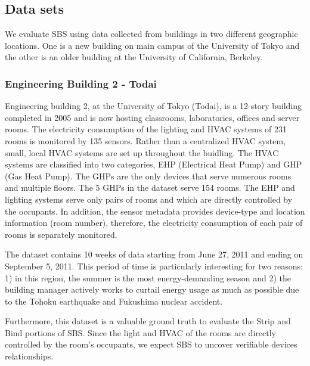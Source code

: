 \subsection{Data sets}
We evaluate SBS using data collected from buildings in two different geographic locations.  
One is a new building on main campus of the University of Tokyo and the other is an older building at 
the University of California, Berkeley.

\subsubsection{Engineering Building 2 - Todai}\label{data:engbldg2}
Engineering building 2, at the University of Tokyo (Todai), is a 12-story building completed in 2005 and is now 
hosting classrooms, laboratories, offices 
and server rooms.  
The electricity consumption of the lighting and HVAC systems of 231 rooms is monitored by 135 sensors.
Rather than a centralized HVAC system, small, local HVAC systems are set up throughout the buidling.  
The HVAC systems are classified into two categories, EHP (Electrical Heat Pump) and GHP (Gas Heat Pump).
The GHPs are the only devices that serve numerous rooms and multiple floors.  The 5 GHPs in the dataset serve 154 rooms.
The EHP and lighting systems serve only pairs of rooms and which are directly controlled by the occupants.
In addition, the sensor metadata provides device-type and location information (room number), 
therefore, the electricity consumption of each pair of rooms is separately monitored.

The dataset contains 10 weeks of data starting from June 27, 2011 and ending on September 5, 2011.
This period of time is particularly interesting for two reasons: 1) in this region, the summer is the most energy-demanding 
season and 2) the building manager actively works to curtail energy usage as much as possible due to the 
Tohoku earthquake and Fukushima nuclear accident.

Furthermore, this dataset is a valuable ground truth to evaluate the Strip and Bind portions of SBS.
Since the light and HVAC of the rooms are directly controlled by the room's occupants, we expect SBS to uncover verifiable devices 
relationships.  


